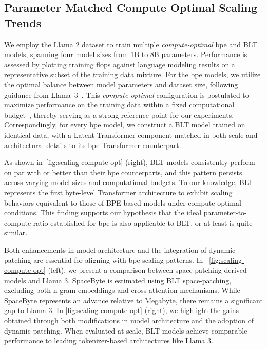 \subsection{Parameter Matched Compute Optimal Scaling Trends}
\label{section:parameter-matched-scaling}
We employ the Llama 2 dataset to train multiple \textit{compute-optimal} bpe and {\textsc BLT} models, spanning four model sizes from 1B to 8B parameters. Performance is assessed by plotting training flops against language modeling results on a representative subset of the training data mixture. For the bpe models, we utilize the optimal balance between model parameters and dataset size, following guidance from Llama~3~\citep{dubey2024llama}. This \textit{compute-optimal} configuration is postulated to maximize performance on the training data within a fixed computational budget~\citep{hoffmann2022training}, thereby serving as a strong reference point for our experiments. Correspondingly, for every bpe model, we construct a {\textsc BLT} model trained on identical data, with a Latent Transformer component matched in both scale and architectural details to its bpe Transformer counterpart.

As shown in~\autoref{fig:scaling-compute-opt} (right), {\textsc BLT} models consistently perform on par with or better than their bpe counterparts, and this pattern persists across varying model sizes and computational budgets. To our knowledge, {\textsc BLT} represents the first byte-level Transformer architecture to exhibit scaling behaviors equivalent to those of BPE-based models under compute-optimal conditions. This finding supports our hypothesis that the ideal parameter-to-compute ratio established for bpe is also applicable to {\textsc BLT}, or at least is quite similar.

Both enhancements in model architecture and the integration of dynamic patching are essential for aligning with bpe scaling patterns. In ~\autoref{fig:scaling-compute-opt} (left), we present a comparison between space-patching-derived models and Llama 3. SpaceByte \citep{slagle2024spacebyte} is estimated using {\textsc BLT} space-patching, excluding both n-gram embeddings and cross-attention mechanisms. While SpaceByte represents an advance relative to Megabyte, there remains a significant gap to Llama 3. In \autoref{fig:scaling-compute-opt} (right), we highlight the gains obtained through both modifications in model architecture and the adoption of dynamic patching. When evaluated at scale, {\textsc BLT} models achieve comparable performance to leading tokenizer-based architectures like Llama 3.

